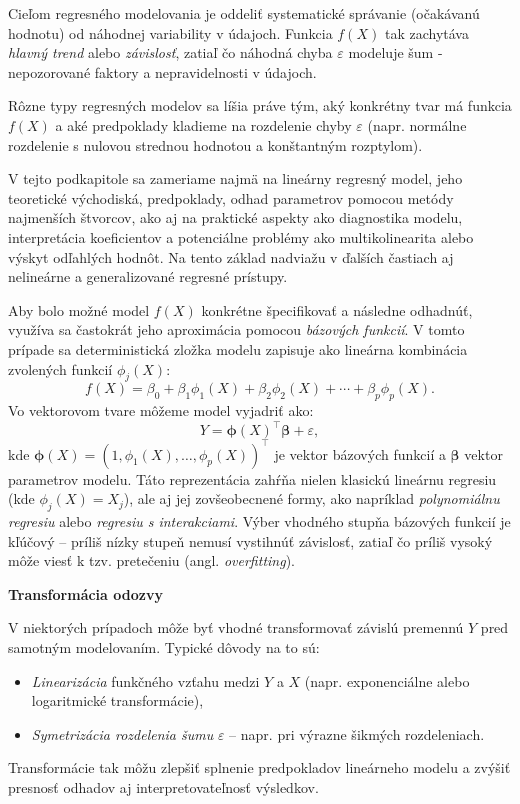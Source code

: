 Cieľom regresného modelovania je oddeliť systematické správanie (očakávanú hodnotu) od náhodnej variability v údajoch. Funkcia $f(X)$ tak zachytáva \textit{hlavný trend} alebo \textit{závislosť}, zatiaľ čo náhodná chyba $\varepsilon$ modeluje šum - nepozorované faktory a nepravidelnosti v údajoch.

Rôzne typy regresných modelov sa líšia práve tým, aký konkrétny tvar má funkcia $f(X)$ a aké predpoklady kladieme na rozdelenie chyby $\varepsilon$ (napr. normálne rozdelenie s nulovou strednou hodnotou a konštantným rozptylom).

V tejto podkapitole sa zameriame najmä na lineárny regresný model, jeho teoretické východiská, predpoklady, odhad parametrov pomocou metódy najmenších štvorcov, ako aj na praktické aspekty ako diagnostika modelu, interpretácia koeficientov a potenciálne problémy ako multikolinearita alebo výskyt odľahlých hodnôt. Na tento základ nadviažu v ďalších častiach aj nelineárne a generalizované regresné prístupy.

\noindent
Aby bolo možné model $f(X)$ konkrétne špecifikovať a následne odhadnúť, využíva sa častokrát jeho aproximácia pomocou \textit{bázových funkcií}. V tomto prípade sa deterministická zložka modelu zapisuje ako lineárna kombinácia zvolených funkcií $\phi_j(X)$:
\begin{equation}
f(X) = \beta_0 + \beta_1 \phi_1(X) + \beta_2 \phi_2(X) + \cdots + \beta_p \phi_p(X).
\end{equation}
Vo vektorovom tvare môžeme model vyjadriť ako:
\begin{equation}
Y = \boldsymbol{\phi}(X)^\top \boldsymbol{\beta} + \varepsilon,
\end{equation}
kde $\boldsymbol{\phi}(X) = (1, \phi_1(X), \ldots, \phi_p(X))^\top$ je vektor bázových funkcií a $\boldsymbol{\beta}$ vektor parametrov modelu. Táto reprezentácia zahŕňa nielen klasickú lineárnu regresiu (kde $\phi_j(X) = X_j$), ale aj jej zovšeobecnené formy, ako napríklad \textit{polynomiálnu regresiu} alebo \textit{regresiu s interakciami}. Výber vhodného stupňa bázových funkcií je kľúčový – príliš nízky stupeň nemusí vystihnúť závislosť, zatiaľ čo príliš vysoký môže viesť k tzv. pretečeniu (angl. \textit{overfitting}).

\smallskip
\noindent
\textbf{Transformácia odozvy} 

V niektorých prípadoch môže byť vhodné transformovať závislú premennú $Y$ pred samotným modelovaním. Typické dôvody na to sú:

\begin{itemize}
  \item \textit{Linearizácia} funkčného vzťahu medzi $Y$ a $X$ (napr. exponenciálne alebo logaritmické transformácie),
  \item \textit{Symetrizácia rozdelenia šumu} $\varepsilon$ – napr. pri výrazne šikmých rozdeleniach.
\end{itemize}
Transformácie tak môžu zlepšiť splnenie predpokladov lineárneho modelu a zvýšiť presnosť odhadov aj interpretovateľnosť výsledkov.


